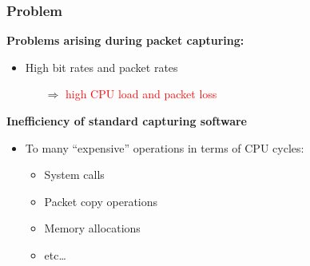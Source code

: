 \begin{frame}
\frametitle{Problem}
\textbf{Problems arising during packet capturing:}
\begin{itemize}
	\item High bit rates and packet rates
		\begin{itemize}
			\item [$\Rightarrow$] \textcolor{red}{high CPU load and packet loss} \newline
		\end{itemize}
\end{itemize}

\textbf{Inefficiency of standard capturing software}
\begin{itemize}
	\item To many ``expensive'' operations in terms of CPU cycles: 
\begin{itemize}
			\item System calls
			\item Packet copy operations
			\item Memory allocations
			\item etc\ldots\newline
\end{itemize}
\end{itemize}
\end{frame}

 {}
